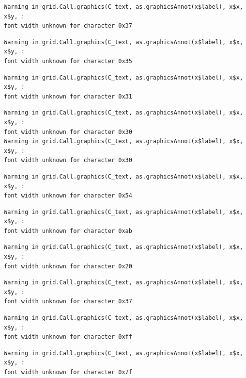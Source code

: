 \documentclass[
  letterpaper,
]{scrbook}
\begin{document}
\begin{verbatim}
Warning in grid.Call.graphics(C_text, as.graphicsAnnot(x$label), x$x, x$y, :
font width unknown for character 0x37
\end{verbatim}

\begin{verbatim}
Warning in grid.Call.graphics(C_text, as.graphicsAnnot(x$label), x$x, x$y, :
font width unknown for character 0x35
\end{verbatim}

\begin{verbatim}
Warning in grid.Call.graphics(C_text, as.graphicsAnnot(x$label), x$x, x$y, :
font width unknown for character 0x31
\end{verbatim}

\begin{verbatim}
Warning in grid.Call.graphics(C_text, as.graphicsAnnot(x$label), x$x, x$y, :
font width unknown for character 0x30
Warning in grid.Call.graphics(C_text, as.graphicsAnnot(x$label), x$x, x$y, :
font width unknown for character 0x30
\end{verbatim}

\begin{verbatim}
Warning in grid.Call.graphics(C_text, as.graphicsAnnot(x$label), x$x, x$y, :
font width unknown for character 0x54
\end{verbatim}

\begin{verbatim}
Warning in grid.Call.graphics(C_text, as.graphicsAnnot(x$label), x$x, x$y, :
font width unknown for character 0xab
\end{verbatim}

\begin{verbatim}
Warning in grid.Call.graphics(C_text, as.graphicsAnnot(x$label), x$x, x$y, :
font width unknown for character 0x20
\end{verbatim}

\begin{verbatim}
Warning in grid.Call.graphics(C_text, as.graphicsAnnot(x$label), x$x, x$y, :
font width unknown for character 0x37
\end{verbatim}

\begin{verbatim}
Warning in grid.Call.graphics(C_text, as.graphicsAnnot(x$label), x$x, x$y, :
font width unknown for character 0xff
\end{verbatim}

\begin{verbatim}
Warning in grid.Call.graphics(C_text, as.graphicsAnnot(x$label), x$x, x$y, :
font width unknown for character 0x7f
\end{verbatim}
\end{document}
